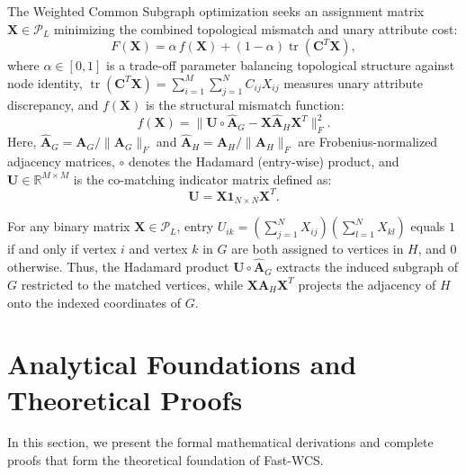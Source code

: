 \documentclass[conference]{IEEEtran}
\begin{document}
The Weighted Common Subgraph optimization seeks an assignment matrix $\mathbf{X} \in \mathcal{P}_L$ minimizing the combined topological mismatch and unary attribute cost:
\begin{equation}
F(\mathbf{X}) = \alpha\, f(\mathbf{X}) + (1 - \alpha)\operatorname{tr}(\mathbf{C}^T\mathbf{X}),
\label{eq:wcs_full_objective}
\end{equation}
where $\alpha \in [0, 1]$ is a trade-off parameter balancing topological structure against node identity, $\operatorname{tr}(\mathbf{C}^T\mathbf{X}) = \sum_{i=1}^M \sum_{j=1}^N C_{ij} X_{ij}$ measures unary attribute discrepancy, and $f(\mathbf{X})$ is the structural mismatch function:
\begin{equation}
f(\mathbf{X}) = \big\| \mathbf{U} \circ \hat{\mathbf{A}}_G - \mathbf{X}\hat{\mathbf{A}}_H\mathbf{X}^T \big\|_F^2.
\label{eq:f_structural}
\end{equation}
Here, $\hat{\mathbf{A}}_G = \mathbf{A}_G / \|\mathbf{A}_G\|_F$ and $\hat{\mathbf{A}}_H = \mathbf{A}_H / \|\mathbf{A}_H\|_F$ are Frobenius-normalized adjacency matrices, $\circ$ denotes the Hadamard (entry-wise) product, and $\mathbf{U} \in \mathbb{R}^{M \times M}$ is the co-matching indicator matrix defined as:
\begin{equation}
\mathbf{U} = \mathbf{X}\mathbf{1}_{N\times N}\mathbf{X}^T.
\label{eq:U_naive}
\end{equation}

For any binary matrix $\mathbf{X} \in \mathcal{P}_L$, entry $U_{ik} = (\sum_{j=1}^N X_{ij})(\sum_{l=1}^N X_{kl})$ equals $1$ if and only if vertex $i$ and vertex $k$ in $G$ are both assigned to vertices in $H$, and $0$ otherwise. Thus, the Hadamard product $\mathbf{U} \circ \hat{\mathbf{A}}_G$ extracts the induced subgraph of $G$ restricted to the matched vertices, while $\mathbf{X}\hat{\mathbf{A}}_H\mathbf{X}^T$ projects the adjacency of $H$ onto the indexed coordinates of $G$.



\section{Analytical Foundations and Theoretical Proofs}
\label{sec:theory}

In this section, we present the formal mathematical derivations and complete proofs that form the theoretical foundation of Fast-WCS.
\end{document}
